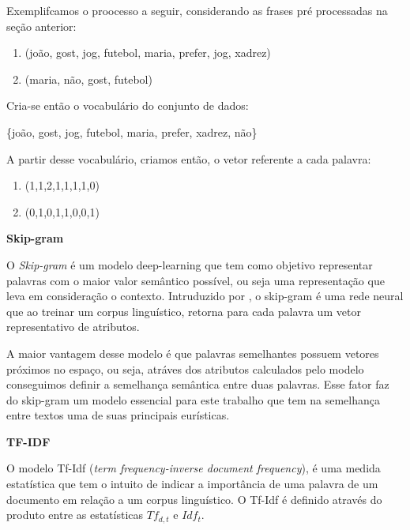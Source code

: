 \documentclass[a4paper,12pt]{article}
\begin{document}
\begin{description}
   Exemplifcamos o proocesso a seguir, considerando as frases pré processadas na seção anterior:
   
    \begin{center}
      \begin{enumerate}
	\item (joão, gost, jog, futebol, maria, prefer, jog, xadrez)
	\item (maria, não, gost, futebol)
      \end{enumerate}
    \end{center}
    
    Cria-se então o vocabulário do conjunto de dados:
    
   \begin{center}
    \{joão, gost, jog, futebol, maria, prefer, xadrez, não\}
   \end{center}

   A partir desse vocabulário, criamos então, o vetor referente a cada palavra:

    \begin{center}
      \begin{enumerate}
	\item (1,1,2,1,1,1,1,0)
	\item (0,1,0,1,1,0,0,1)
      \end{enumerate}
    \end{center}
   
 
 \item \textbf{Skip-gram}

  O \textit{Skip-gram} é um modelo deep-learning que tem como objetivo representar palavras com o maior valor semântico possível, ou seja
  uma representação que leva em consideração o contexto. Intruduzido
  por \cite{mikolov2013efficient}, o skip-gram é uma rede neural que ao treinar um corpus linguístico, retorna para cada palavra um vetor 
  representativo de atributos.
  
  A maior vantagem desse modelo é que palavras semelhantes possuem vetores próximos no espaço, ou seja, atráves dos atributos calculados pelo
  modelo conseguimos definir a semelhança semântica entre duas palavras. Esse fator faz do skip-gram um modelo essencial para este trabalho
  que tem na semelhança entre textos uma de suas principais eurísticas.
  
 \item \textbf{TF-IDF}
 
  O modelo Tf-Idf (\textit{term frequency-inverse document frequency}), é uma medida estatística que tem o intuito de indicar
  a importância de uma palavra de um documento em relação a um corpus linguístico. O Tf-Idf é definido através do produto entre as 
  estatísticas $Tf_{d,t}$ e $Idf_{t}$.


\end{description}
\end{document}
